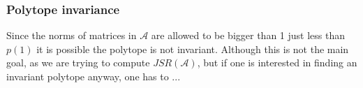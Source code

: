 \subsubsection*{Polytope invariance}
Since the norms of matrices in $\mathcal{A}$ are allowed to be bigger than 1 just less than $p(1)$ it is possible the polytope is not invariant. Although this is not the main goal, as we are trying to compute $JSR(\mathcal{A})$, but if one is interested in finding an invariant polytope anyway, one has to ...

